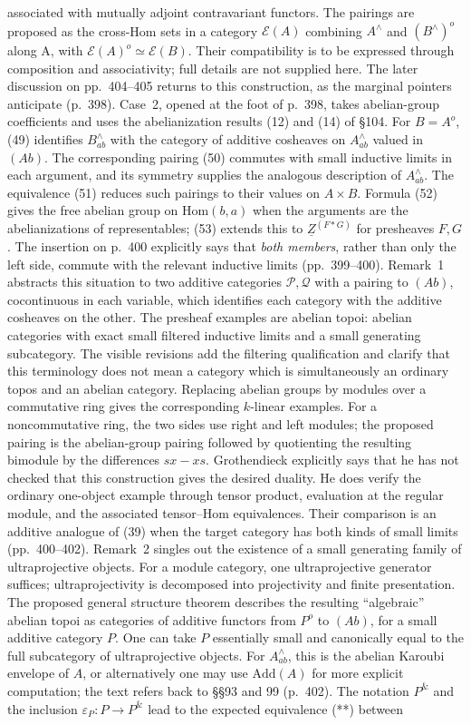 \documentclass[10pt,oneside]{book}
\begin{document}
associated with mutually adjoint contravariant functors. The pairings are proposed as the cross-Hom sets in a category $\mathcal E(A)$ combining $A^\wedge$ and $(B^\wedge)^o$ along A, with $\mathcal E(A)^o\simeq\mathcal E(B)$. Their compatibility is to be expressed through composition and associativity; full details are not supplied here. The later discussion on pp.\ 404--405 returns to this construction, as the marginal pointers anticipate (p.\ 398). Case~2, opened at the foot of p.\ 398, takes abelian-group coefficients and uses the abelianization results (12) and (14) of \S104. For $B=A^o$, (49) identifies $B^\wedge_{ab}$ with the category of additive cosheaves on $A^\wedge_{ab}$ valued in $(Ab)$. The corresponding pairing (50) commutes with small inductive limits in each argument, and its symmetry supplies the analogous description of $A^\wedge_{ab}$. The equivalence (51) reduces such pairings to their values on $A\times B$. Formula (52) gives the free abelian group on $\mathrm{Hom}(b,a)$ when the arguments are the abelianizations of representables; (53) extends this to $\underline Z^{(F*G)}$ for presheaves $F,G$. The insertion on p.\ 400 explicitly says that \emph{both members}, rather than only the left side, commute with the relevant inductive limits (pp.\ 399--400). Remark~1 abstracts this situation to two additive categories $\mathcal P,\mathcal Q$ with a pairing to $(Ab)$, cocontinuous in each variable, which identifies each category with the additive cosheaves on the other. The presheaf examples are abelian topoi: abelian categories with exact small filtered inductive limits and a small generating subcategory. The visible revisions add the filtering qualification and clarify that this terminology does not mean a category which is simultaneously an ordinary topos and an abelian category. Replacing abelian groups by modules over a commutative ring gives the corresponding $k$-linear examples. For a noncommutative ring, the two sides use right and left modules; the proposed pairing is the abelian-group pairing followed by quotienting the resulting bimodule by the differences $sx-xs$. Grothendieck explicitly says that he has not checked that this construction gives the desired duality. He does verify the ordinary one-object example through tensor product, evaluation at the regular module, and the associated tensor--Hom equivalences. Their comparison is an additive analogue of (39) when the target category has both kinds of small limits (pp.\ 400--402). Remark~2 singles out the existence of a small generating family of ultraprojective objects. For a module category, one ultraprojective generator suffices; ultraprojectivity is decomposed into projectivity and finite presentation. The proposed general structure theorem describes the resulting “algebraic” abelian topoi as categories of additive functors from $P^o$ to $(Ab)$, for a small additive category $P$. One can take $P$ essentially small and canonically equal to the full subcategory of ultraprojective objects. For $A^\wedge_{ab}$, this is the abelian Karoubi envelope of $A$, or alternatively one may use $\mathrm{Add}(A)$ for more explicit computation; the text refers back to \S\S93 and 99 (p.\ 402). The notation $P^{\&}$ and the inclusion $\varepsilon_P:P\to P^{\&}$ lead to the expected equivalence (**) between 
\end{document}

